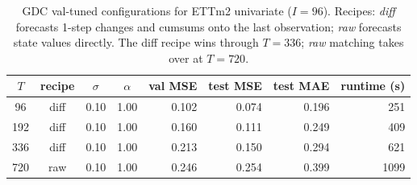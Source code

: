\begin{table}[t]
\centering
\caption{GDC val-tuned configurations for ETTm2 univariate ($I=96$). Recipes: \emph{diff} forecasts 1-step changes and cumsums onto the last observation; \emph{raw} forecasts state values directly. The diff recipe wins through $T=336$; \emph{raw} matching takes over at $T=720$.}
\label{tab:ettm2_picks}
\begin{tabular}{c c c c r r r r}
\toprule
$T$ & recipe & $\sigma$ & $\alpha$ & val MSE & test MSE & test MAE & runtime (s) \\
\midrule
 96 & diff & 0.10 & 1.00 & 0.102 & 0.074 & 0.196 &  251 \\
192 & diff & 0.10 & 1.00 & 0.160 & 0.111 & 0.249 &  409 \\
336 & diff & 0.10 & 1.00 & 0.213 & 0.150 & 0.294 &  621 \\
720 & raw  & 0.10 & 1.00 & 0.246 & 0.254 & 0.399 & 1099 \\
\bottomrule
\end{tabular}
\end{table}
